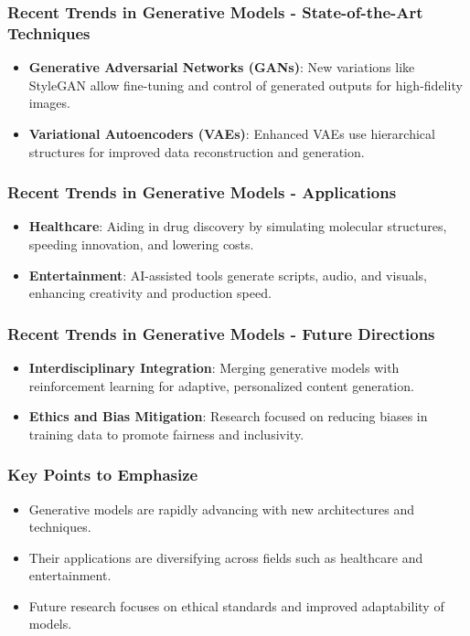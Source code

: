 \documentclass[aspectratio=169]{beamer}
\begin{document}
\begin{frame}[fragile]
    \frametitle{Recent Trends in Generative Models - State-of-the-Art Techniques}
    \begin{itemize}
        \item \textbf{Generative Adversarial Networks (GANs)}: New variations like StyleGAN allow fine-tuning and control of generated outputs for high-fidelity images.
        \item \textbf{Variational Autoencoders (VAEs)}: Enhanced VAEs use hierarchical structures for improved data reconstruction and generation.
    \end{itemize}
\end{frame}

\begin{frame}[fragile]
    \frametitle{Recent Trends in Generative Models - Applications}
    \begin{itemize}
        \item \textbf{Healthcare}: Aiding in drug discovery by simulating molecular structures, speeding innovation, and lowering costs.
        \item \textbf{Entertainment}: AI-assisted tools generate scripts, audio, and visuals, enhancing creativity and production speed.
    \end{itemize}
\end{frame}

\begin{frame}[fragile]
    \frametitle{Recent Trends in Generative Models - Future Directions}
    \begin{itemize}
        \item \textbf{Interdisciplinary Integration}: Merging generative models with reinforcement learning for adaptive, personalized content generation.
        \item \textbf{Ethics and Bias Mitigation}: Research focused on reducing biases in training data to promote fairness and inclusivity.
    \end{itemize}
\end{frame}

\begin{frame}[fragile]
    \frametitle{Key Points to Emphasize}
    \begin{itemize}
        \item Generative models are rapidly advancing with new architectures and techniques.
        \item Their applications are diversifying across fields such as healthcare and entertainment.
        \item Future research focuses on ethical standards and improved adaptability of models.
    \end{itemize}
\end{frame}
\end{document}
